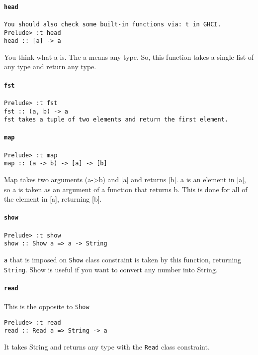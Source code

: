 \paragraph{\lstinline{head} }

\begin{lstlisting}
You should also check some built-in functions via: t in GHCI.
Prelude> :t head
head :: [a] -> a
\end{lstlisting}

You think what a is. The a means any type. So, this function takes a single list of any type and return any type.

\paragraph{\lstinline{fst}}

\begin{lstlisting}
Prelude> :t fst
fst :: (a, b) -> a
fst takes a tuple of two elements and return the first element.
\end{lstlisting}

\paragraph{\lstinline{map}}
\begin{lstlisting}
Prelude> :t map
map :: (a -> b) -> [a] -> [b]
\end{lstlisting}

Map takes two arguments (a->b) and [a] and returns [b]. a is an element in [a], so a is taken as an argument of a function that returns b. This is done for all of the element in [a], returning [b].

\paragraph{{\lstinline{show}}}
\begin{lstlisting}
Prelude> :t show
show :: Show a => a -> String
\end{lstlisting}

\lstinline{a} that is imposed on \lstinline{Show} class constraint is taken by this function, returning \lstinline{String}. Show is useful if you want to convert any number into String.

\paragraph{\lstinline{read}}
This is the opposite to \lstinline{Show}
\begin{lstlisting}
Prelude> :t read
read :: Read a => String -> a
\end{lstlisting}

It takes String and returns any type with the \lstinline{Read} class constraint.  
